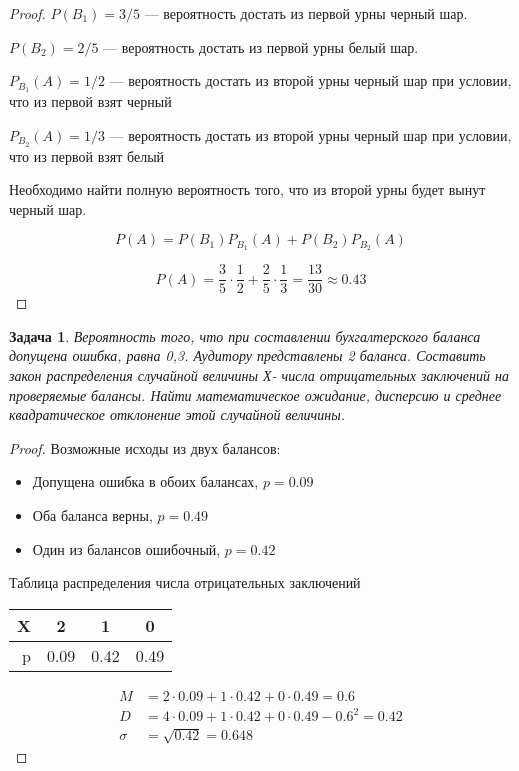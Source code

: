 \documentclass[14pt,a4paper]{extarticle}%
\newtheorem{task}[theorem]{Задача}
\begin{document}
\begin{proof}\hfill\par
  $P(B_1) = 3/5$ --- вероятность достать из первой урны черный шар.

  $P(B_2) = 2/5$ --- вероятность достать из первой урны белый шар.
  
  $P_{B_1}(A) = 1/2$ --- вероятность достать из второй урны черный
  шар при условии, что из первой взят черный

  $P_{B_2}(A) = 1/3$ --- вероятность достать из второй урны черный
  шар при условии, что из первой взят белый

  Необходимо найти полную вероятность того, что из второй урны будет
  вынут черный шар.

  \[
    P(A) = P(B_1)P_{B_1}(A) + P(B_2)P_{B_2}(A)
  \]

  \[
    P(A) = \frac{3}{5}\cdot\frac{1}{2} + \frac{2}{5}\cdot\frac{1}{3}
    = \frac{13}{30} \approx 0.43
  \]
\end{proof}

\begin{task}
  Вероятность того, что при составлении бухгалтерского баланса
  допущена ошибка, равна 0,3. Аудитору представлены 2 баланса.
  Составить закон распределения случайной величины Х- числа
  отрицательных заключений на проверяемые балансы. Найти
  математическое ожидание, дисперсию и среднее квадратическое
  отклонение этой случайной величины.
\end{task}

\begin{proof}
  Возможные исходы из двух балансов:
  \begin{itemize}
    \setlength\itemsep{-.4cm}
    \item Допущена ошибка в обоих балансах, $p = 0.09$
    \item Оба баланса верны, $p = 0.49$
    \item Один из балансов ошибочный, $p = 0.42$
  \end{itemize}

  Таблица распределения числа отрицательных заключений

  \begin{center}
    \begin{tabular}{rccc}
      \toprule
      X & 2    & 1    & 0 \\
      \midrule
      p & 0.09 & 0.42 & 0.49 \\
      \bottomrule
    \end{tabular}
  \end{center}

  \[
    \begin{aligned}
      M &= 2\cdot0.09 + 1\cdot0.42 + 0\cdot0.49 = 0.6 \\
      D &= 4\cdot0.09 + 1\cdot0.42 + 0\cdot0.49 - 0.6^2 = 0.42 \\
      \sigma &= \sqrt{0.42} = 0.648
    \end{aligned}
  \]
\end{proof}
\end{document}
